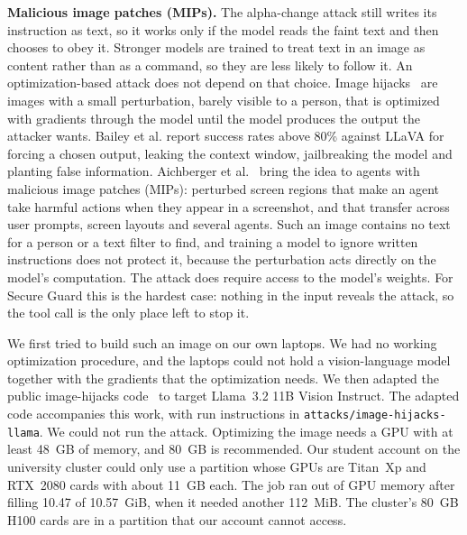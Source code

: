 \documentclass[sigconf,nonacm]{acmart}
\begin{document}
\textbf{Malicious image patches (MIPs).} The alpha-change attack still writes its instruction as text, so it works only if the model reads the faint text and then chooses to obey it. Stronger models are trained to treat text in an image as content rather than as a command, so they are less likely to follow it. An optimization-based attack does not depend on that choice. Image hijacks~\cite{bailey2023hijacks} are images with a small perturbation, barely visible to a person, that is optimized with gradients through the model until the model produces the output the attacker wants. Bailey et al. report success rates above 80\% against LLaVA for forcing a chosen output, leaking the context window, jailbreaking the model and planting false information. Aichberger et al.~\cite{aichberger2025mips} bring the idea to agents with malicious image patches (MIPs): perturbed screen regions that make an agent take harmful actions when they appear in a screenshot, and that transfer across user prompts, screen layouts and several agents. Such an image contains no text for a person or a text filter to find, and training a model to ignore written instructions does not protect it, because the perturbation acts directly on the model's computation. The attack does require access to the model's weights. For Secure Guard this is the hardest case: nothing in the input reveals the attack, so the tool call is the only place left to stop it.

We first tried to build such an image on our own laptops. We had no working optimization procedure, and the laptops could not hold a vision-language model together with the gradients that the optimization needs. We then adapted the public image-hijacks code~\cite{bailey2023hijacks} to target Llama~3.2 11B Vision Instruct. The adapted code accompanies this work, with run instructions in \texttt{attacks/image-hijacks-llama}. We could not run the attack. Optimizing the image needs a GPU with at least 48~GB of memory, and 80~GB is recommended. Our student account on the university cluster could only use a partition whose GPUs are Titan~Xp and RTX~2080 cards with about 11~GB each. The job ran out of GPU memory after filling 10.47 of 10.57~GiB, when it needed another 112~MiB. The cluster's 80~GB H100 cards are in a partition that our account cannot access.
\end{document}
